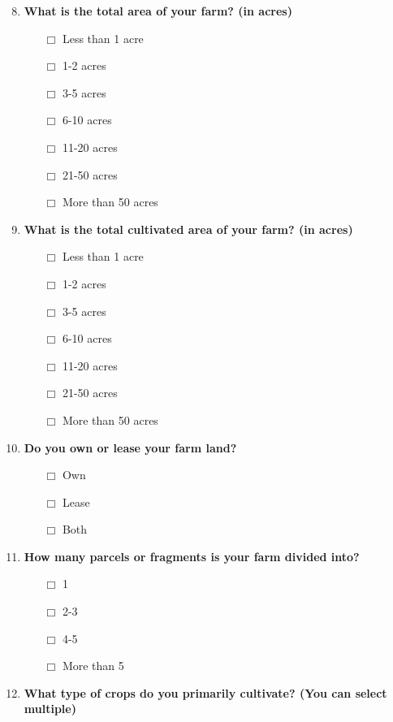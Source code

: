 \documentclass[12pt]{article}
\begin{document}
\begin{enumerate}[label=\arabic*.]
    \setcounter{enumi}{7}
    \item \textbf{What is the total area of your farm? (in acres)}
    \begin{itemize}
        \item [$\Box$] Less than 1 acre
        \item [$\Box$] 1-2 acres
        \item [$\Box$] 3-5 acres
        \item [$\Box$] 6-10 acres
        \item [$\Box$] 11-20 acres
        \item [$\Box$] 21-50 acres
        \item [$\Box$] More than 50 acres
    \end{itemize}
    \item \textbf{What is the total cultivated area of your farm? (in acres)}
    \begin{itemize}
        \item [$\Box$] Less than 1 acre
        \item [$\Box$] 1-2 acres
        \item [$\Box$] 3-5 acres
        \item [$\Box$] 6-10 acres
        \item [$\Box$] 11-20 acres
        \item [$\Box$] 21-50 acres
        \item [$\Box$] More than 50 acres
    \end{itemize}
    \item \textbf{Do you own or lease your farm land?}
    \begin{itemize}
        \item [$\Box$] Own
        \item [$\Box$] Lease
        \item [$\Box$] Both
    \end{itemize}
    \item \textbf{How many parcels or fragments is your farm divided into?}
    \begin{itemize}
        \item [$\Box$] 1
        \item [$\Box$] 2-3
        \item [$\Box$] 4-5
        \item [$\Box$] More than 5
    \end{itemize}
    \item \textbf{What type of crops do you primarily cultivate? (You can select multiple)}

\end{enumerate}
\end{document}
